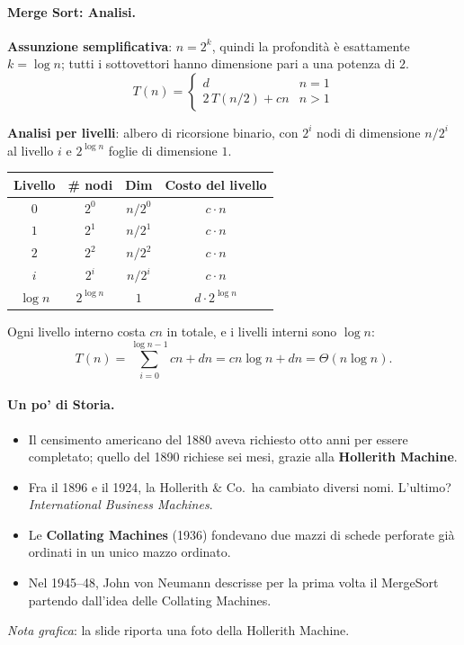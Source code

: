 \documentclass[12pt, a4paper]{article}
\begin{document}
\paragraph{Merge Sort: Analisi.}
\textbf{Assunzione semplificativa}: $n=2^k$, quindi la profondità è esattamente $k=\log n$; tutti i sottovettori hanno dimensione pari a una potenza di $2$.
$$T(n) = \begin{cases} d & n = 1 \\ 2\,T(n/2) + cn & n > 1 \end{cases}$$

\textbf{Analisi per livelli}: albero di ricorsione binario, con $2^i$ nodi di dimensione $n/2^i$ al livello $i$ e $2^{\log n}$ foglie di dimensione $1$.
\begin{center}
\begin{tabular}{cccc}
\toprule
\textbf{Livello} & \textbf{\# nodi} & \textbf{Dim} & \textbf{Costo del livello} \\
\midrule
$0$ & $2^0$ & $n/2^0$ & $c\cdot n$ \\
$1$ & $2^1$ & $n/2^1$ & $c\cdot n$ \\
$2$ & $2^2$ & $n/2^2$ & $c\cdot n$ \\
$i$ & $2^i$ & $n/2^i$ & $c\cdot n$ \\
$\log n$ & $2^{\log n}$ & $1$ & $d\cdot 2^{\log n}$ \\
\bottomrule
\end{tabular}
\end{center}
Ogni livello interno costa $cn$ in totale, e i livelli interni sono $\log n$:
$$T(n) = \sum_{i=0}^{\log n-1} cn + dn = cn\log n + dn = \Theta(n\log n).$$

\paragraph{Un po' di Storia.}
\begin{itemize}
    \item Il censimento americano del 1880 aveva richiesto otto anni per essere completato; quello del 1890 richiese sei mesi, grazie alla \textbf{Hollerith Machine}.
    \item Fra il 1896 e il 1924, la Hollerith \& Co.\ ha cambiato diversi nomi. L'ultimo? \textit{International Business Machines}.
    \item Le \textbf{Collating Machines} (1936) fondevano due mazzi di schede perforate già ordinati in un unico mazzo ordinato.
    \item Nel 1945--48, John von Neumann descrisse per la prima volta il MergeSort partendo dall'idea delle Collating Machines.
\end{itemize}
\textit{Nota grafica}: la slide riporta una foto della Hollerith Machine.
\end{document}
